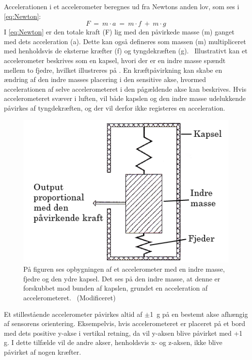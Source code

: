 Accelerationen i et accelerometer beregnes ud fra Newtons anden lov, som ses i \eqref{eq:Newton}:
\begin{equation}\label{eq:Newton}
F~=~m \cdot a~=~m \cdot f~+~m \cdot g
\end{equation} 
I \eqref{eq:Newton} er den totale kraft (F) lig med den påvirkede masse (m) ganget med dets acceleration (a). Dette kan også defineres som massen (m) multipliceret med henholdsvis de eksterne kræfter (f) og tyngdekræften (g).~\citep{TittertonWeston2004,Academic2016d} \newline
Illustrativt kan et accelerometer beskrives som en kapsel, hvori der er en indre masse spændt mellem to fjedre, hvilket illustreres på . En kræftpåvirkning kan skabe en ændring af den indre masses placering i den sensitive akse, hvormed accelerationen af selve accelerometeret i den pågældende akse kan beskrives. Hvis accelerometeret svæver i luften, vil både kapslen og den indre masse udelukkende påvirkes af tyngdekræften, og der vil derfor ikke registeres en acceleration.~\citep{TittertonWeston2004,Academic2016d}
\begin{figure}[H]
	\centering
	\includegraphics[scale=0.4]{figures/bProblemloesning/accelerometer_basic.png}
	\caption{På figuren ses opbygningen af et accelerometer med en indre masse, fjedre og den ydre kapsel. Det ses på den indre masse, at denne er forskubbet mod bunden af kapslen, grundet en acceleration af accelerometeret.~\citep{TittertonWeston2004} (Modificeret)}
	\label{acc_simpelt}
\end{figure}\vspace{-.25cm}
Et stillestående accelerometer påvirkes altid af $\pm$1~g på en bestemt akse afhængig af sensorens orientering. Eksempelvis, hvis accelerometeret er placeret på et bord med dets positive y-akse i vertikal retning, da vil y-aksen blive påvirket med +1 g. I dette tilfælde vil de andre akser, henholdsvis x- og z-aksen, ikke blive påvirket af nogen kræfter.~\citep{Serway2010}

